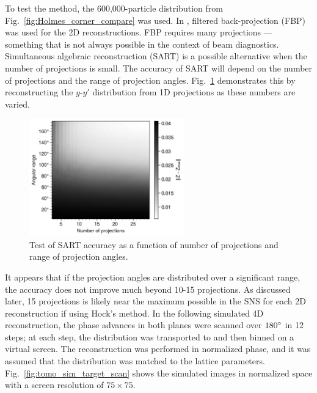 To test the method, the 600,000-particle distribution from Fig.~\ref{fig:Holmes_corner_compare} was used. In \cite{Hock2013a}, filtered back-projection (FBP) was used for the 2D reconstructions. FBP requires many projections — something that is not always possible in the context of beam diagnostics. Simultaneous algebraic reconstruction (SART) is a possible alternative when the number of projections is small. The accuracy of SART will depend on the number of projections and the range of projection angles. Fig.~\ref{fig:tomo_sim_art2D} demonstrates this by reconstructing the $y$-$y'$ distribution from 1D projections as these numbers are varied.
%
\begin{figure}[!p]
    \centering
    \vspace*{3.0cm}
    \includegraphics[width=0.6\textwidth]{Images/chapter4/tomo_sim_art2d.png}
    \caption{Test of SART accuracy as a function of number of projections and range of projection angles.}
    \label{fig:tomo_sim_art2D}
    \vspace*{3.0cm}
\end{figure}
%
It appears that if the projection angles are distributed over a significant range, the accuracy does not improve much beyond 10-15 projections. As discussed later, 15 projections is likely near the maximum possible in the SNS for each 2D reconstruction if using Hock's method. In the following simulated 4D reconstruction, the phase advances in both planes were scanned over $180\degree$ in 12 steps; at each step, the distribution was transported to and then binned on a virtual screen. The reconstruction was performed in normalized phase, and it was assumed that the distribution was matched to the lattice parameters. Fig.~\ref{fig:tomo_sim_target_scan} shows the simulated images in normalized space with a screen resolution of $75 \times 75$.
%
